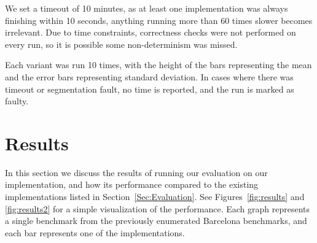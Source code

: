 \documentclass[sigconf]{acmart}
\begin{document}
We set a timeout of 10 minutes, as at least one implementation was always
finishing within 10 seconds, anything running more than 60 times slower becomes
irrelevant. Due to time constraints, correctness checks were not performed on
every run, so it is possible some non-determinism was missed. 

Each variant was run 10 times, with the height of the bars representing the
mean and the error bars representing standard deviation. In cases where there
was timeout or segmentation fault, no time is reported, and the run is marked
as faulty. 

\section{Results} \label{Sec:Results}

In this section we discuss the results of running our evaluation on our
implementation, and how its performance compared to the existing
implementations listed in Section~\ref{Sec:Evaluation}. See
Figures~\ref{fig:results} and \ref{fig:results2} for a simple visualization of
the performance. Each graph represents a single benchmark from the previously
enumerated Barcelona benchmarks, and each bar represents one of the
implementations. 
\end{document}
